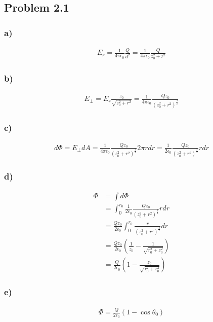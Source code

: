\documentclass[../homework.tex]{subfiles}
\begin{document}
\subsection{Problem 2.1}
\subsubsection*{a)}
\begin{align*}
    E_r = \frac{1}{4 \pi \epsilon_0} \frac{Q}{d^2} = \frac{1}{4 \pi \epsilon_0} \frac{Q}{z_0^2 + r^2}
\end{align*}
\subsubsection*{b)}
\begin{align*}
    E_{\bot} = E_r \frac{z_0}{\sqrt{z_0^2 + r^2}} = \frac{1}{4 \pi \epsilon_0} \frac{Qz_0}{(z_0^2 + r^2)^\frac{3}{2}}
\end{align*}
\subsubsection*{c)}
\begin{align*}
    d\Phi = E_\bot dA = \frac{1}{4 \pi \epsilon_0} \frac{Qz_0}{(z_0^2 + r^2)^\frac{3}{2}} 2 \pi r dr
    = \frac{1}{2 \epsilon_0} \frac{Qz_0}{(z_0^2 + r^2)^\frac{3}{2}} r dr
\end{align*}
\subsubsection*{d)}
\begin{align*}
    \Phi &= \int d\Phi \\
         &= \int_{0}^{r_0} \frac{1}{2 \epsilon_0} \frac{Qz_0}{(z_0^2 + r^2)^\frac{3}{2}} r dr \\
         &= \frac{Qz_0}{2 \epsilon_0} \int_{0}^{r_0} \frac{r}{(z_0^2 + r^2)^\frac{3}{2}}dr \\
         &= \frac{Qz_0}{2 \epsilon_0} \left(
             \frac{1}{z_0} - \frac{1}{\sqrt{r_0^2 + z_0^2}}
         \right) \\
         &= \frac{Q}{2 \epsilon_0} \left(
            1 - \frac{z_0}{\sqrt{r_0^2 + z_0^2}}
        \right)
\end{align*}
\subsubsection*{e)}
\begin{align*}
    \Phi = \frac{Q}{2\epsilon_0} (1 - \cos{\theta_0})
\end{align*}
\end{document}
